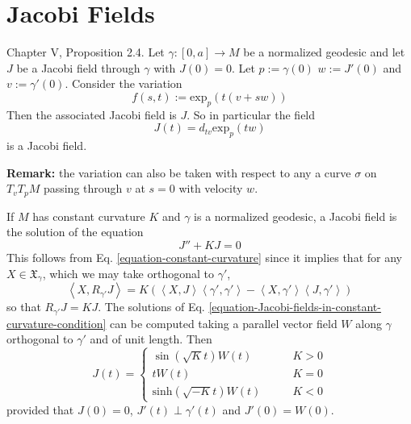 \section{Jacobi Fields}
\label{section-jacobi-fields}

\begin{proposition}
\label{proposition-everyday-jacobi-field}
\cite{doc} Chapter V, Proposition 2.4. Let $\gamma:[0,a]\to M$ be a normalized
geodesic and let $J$ be a Jacobi field through $\gamma$ with $J(0)=0$.
Let $p:=\gamma(0)$ $w:=J'(0)$ and  $v:=\gamma'(0)$. 
Consider the variation
$$
f(s,t):=\text{exp}_{p}(t(v+sw))
$$
Then the associated Jacobi field is $J$. So in particular the field
$$
J(t)=d_{tv}\text{exp}_p(tw)
$$
is a Jacobi field.

{\bf Remark:} the variation can also be taken with respect to
any a curve $\sigma$ on $T_vT_{p}M$ passing through $v$ 
at $s=0$ with velocity $w$.
\end{proposition}

\begin{example}
\label{example-jacobi-fields-in-constant-curvature-condition}
If $M$ has constant curvature $K$ and $\gamma$ is a normalized geodesic, a 
Jacobi field is the solution of the equation
\begin{equation}
\label{equation-Jacobi-fields-in-constant-curvature-condition}
J''+KJ=0
\end{equation}
This follows from Eq. \ref{equation-constant-curvature} since it implies that
for any $X\in\mathfrak{X}_\gamma$, which we may take orthogonal to $\gamma'$,
$$
\left<X,R_{\gamma'}J\right>
=K(\left<X,J\right>\left<\gamma',\gamma'\right>
-\left<X,\gamma'\right>\left<J,\gamma'\right>)
$$
so that $R_{\gamma'}J=KJ$. The solutions of Eq.
\ref{equation-Jacobi-fields-in-constant-curvature-condition} can be computed taking a
parallel vector field $W$ along $\gamma$ orthogonal to $\gamma'$ and of unit
length. Then
\begin{equation}
\label{equation-Jacobi-fields-in-constant-curvature}
J(t)=\begin{cases}
\sin(\sqrt{K}t)W(t)\qquad & K>0\\
tW(t)\qquad &K=0\\
\text{sinh}(\sqrt{-K}t)W(t)\qquad &K<0
\end{cases}
\end{equation}
provided that $J(0)=0$, $J'(t)\perp \gamma'(t)$ and $J'(0)=W(0)$.
\end{example}

